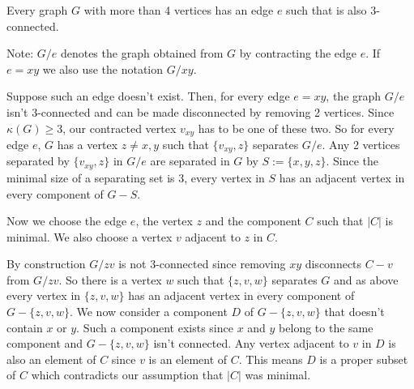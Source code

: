 \documentclass[12pt]{article}
\begin{document}
Every  graph $G$ with more
than 4 vertices has an edge $e$ such that  is also $3$-connected.

Note: $G/e$ denotes the graph obtained from $G$ by contracting the edge $e$.
If $e=xy$ we also use the notation $G/xy$.

Suppose such an edge doesn't exist. Then, for every edge $e=xy$, the
graph $G/e$ isn't $3$-connected and can be made disconnected by
removing 2 vertices. Since $\kappa(G)\geq 3$, our contracted vertex
$v_{xy}$ has to be one of these two. So for every edge $e$, $G$ has a
vertex $z\neq x,y$ such that $\{v_{xy},z\}$ separates $G/e$.  Any 2
vertices separated by $\{v_{xy},z\}$ in $G/e$ are separated in $G$ by
$S:=\{x,y,z\}$. Since the minimal size of a separating set is 3, every
vertex in $S$ has an adjacent vertex in every component of $G-S$.

Now we choose the edge $e$, the vertex $z$ and the component $C$ such
that $|C|$ is minimal. We also choose a vertex $v$ adjacent to $z$ in
$C$.

By construction $G/zv$ is not $3$-connected since removing $xy$
disconnects $C-v$ from $G/zv$. So there is a vertex $w$ such that
$\{z,v,w\}$ separates $G$ and as above every vertex in $\{z,v,w\}$ has
an adjacent vertex in every component of $G-\{z,v,w\}$. We now
consider a component $D$ of $G-\{z,v,w\}$ that doesn't contain $x$ or
$y$. Such a component exists since $x$ and $y$ belong to the same
component and $G-\{z,v,w\}$ isn't connected. Any vertex adjacent to
$v$ in $D$ is also an element of $C$ since $v$ is an element of
$C$. This means $D$ is a proper subset of $C$ which contradicts our
assumption that $|C|$ was minimal.
\end{document}
